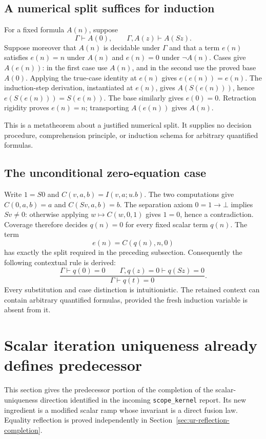\documentclass[11pt]{article}
\theoremstyle{definition}\newtheorem{definition}[theorem]{Definition}
\begin{document}
\subsection{A numerical split suffices for induction}
For a fixed formula $A(n)$, suppose
\[
 \Gamma\vdash A(0),\qquad \Gamma,A(z)\vdash A(Sz).
\]
Suppose moreover that $A(n)$ is decidable under $\Gamma$ and that a term
$e(n)$ satisfies $e(n)=n$ under $A(n)$ and $e(n)=0$ under $\neg A(n)$.
Cases give $A(e(n))$: in the first case use $A(n)$, and in the second
use the proved base $A(0)$.  Applying the true-case identity at $e(n)$
gives $e(e(n))=e(n)$.  The induction-step derivation, instantiated at
$e(n)$, gives $A(S(e(n)))$, hence $e(S(e(n)))=S(e(n))$.
The base similarly gives $e(0)=0$.  Retraction rigidity proves $e(n)=n$;
transporting $A(e(n))$ gives $A(n)$.

This is a metatheorem about a justified numerical split.  It supplies no
decision procedure, comprehension principle, or induction schema for
arbitrary quantified formulas.

\subsection{The unconditional zero-equation case}
Write $1=S0$ and $C(v,a,b)=I(v,a;u.b)$.  The two computations give
$C(0,a,b)=a$ and $C(Sv,a,b)=b$.
The separation axiom $0=1\to\bot$ implies $Sv\ne0$: otherwise applying
$w\mapsto C(w,0,1)$ gives $1=0$, hence a contradiction.
Coverage therefore decides $q(n)=0$ for every fixed scalar term $q(n)$.
The term
\[
                             e(n)=C(q(n),n,0)
\]
has exactly the split required in the preceding subsection.
Consequently the following contextual rule is derived:
\[
 \frac{\Gamma\vdash q(0)=0\qquad
       \Gamma,q(z)=0\vdash q(Sz)=0}
      {\Gamma\vdash q(t)=0}.                            \tag{ZI}
\]
Every substitution and case distinction is intuitionistic.  The retained
context can contain arbitrary quantified formulas, provided the fresh
induction variable is absent from it.

\section{Scalar iteration uniqueness already defines predecessor}
\label{sec:ur-predecessor}

This section gives the predecessor portion of the completion of the
scalar-uniqueness direction identified in the incoming
\texttt{scope\_kernel} report.  Its new ingredient is a modified scalar
ramp whose invariant is a direct fusion law.  Equality reflection is
proved independently in Section~\ref{sec:ur-reflection-completion}.
\end{document}
